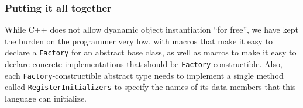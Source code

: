 \documentclass[a4paper]{article}
\providecommand{\tabularnewline}{\\}
\begin{document}




\subsubsection{Putting it all together}

While C++ does not allow dyanamic object instantiation ``for free'',
we have kept the burden on the programmer very low, with macros that
make it easy to declare a \texttt{Factory} for an abstract base class,
as well as macros to make it easy to declare concrete implementations
that should be \texttt{Factory}-constructible.  Also, each
\texttt{Factory}-constructible abstract type needs to implement a
single method called \texttt{RegisterInitializers} to specify the
names of its data members that this language can initialize.
\end{document}
